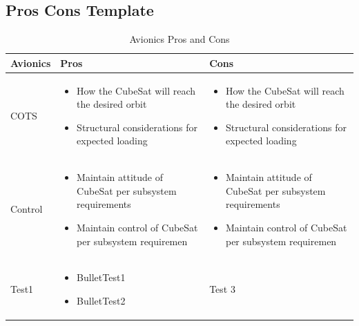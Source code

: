 \subsection{Pros Cons Template}
\begin{table}[H]
\centering
\begin{tabular}{|p{}|p{}|p{}|} 
\hline
\textbf{Avionics} & \textbf{Pros} & \textbf{Cons}
\\
\hline
     COTS
     &
    \begin{itemize}
        \item How the CubeSat will reach the desired orbit
        \item Structural considerations for expected loading
    \end{itemize}
    &
    \begin{itemize}
        \item How the CubeSat will reach the desired orbit
        \item Structural considerations for expected loading
    \end{itemize}
    \\
\hline
     Control
     &
    \begin{itemize}
        \item Maintain attitude of CubeSat per subsystem requirements
        \item Maintain control of CubeSat per subsystem requiremen
    \end{itemize}
    &
        \begin{itemize}
        \item Maintain attitude of CubeSat per subsystem requirements
        \item Maintain control of CubeSat per subsystem requiremen
    \end{itemize}
    \\
\hline
    Test1
    &
    \begin{itemize}
        \item BulletTest1
        \item BulletTest2
    \end{itemize}
    &
    Test 3
    \\
\hline
\end{tabular}
\caption{Avionics Pros and Cons \cite{Boain}}
\label{tbl:avionicsprocon}
\end{table}

